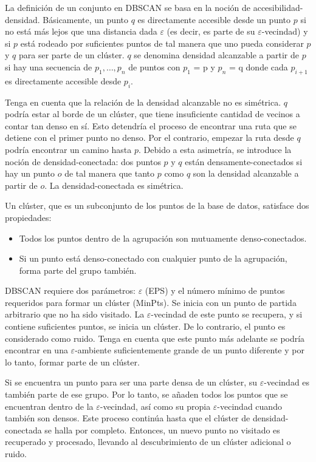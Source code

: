 La definición de un conjunto en DBSCAN se basa en la noción de
accesibilidad-densidad. Básicamente, un punto $q$ es directamente accesible
desde un punto $p$ si no está más lejos que una distancia dada $\varepsilon$ (es 
decir, es parte de su $\varepsilon$-vecindad) y si $p$ está rodeado por
suficientes puntos de tal manera que uno pueda considerar $p$ y $q$ para ser
parte de un clúster. $q$ se denomina densidad alcanzable a partir de $p$ si hay
una secuencia de $p_1,\ldots,p_n$ de puntos con $p_1$ = p y $p_n$ = q donde cada 
$p_{i+1}$ es directamente accesible desde $p_i$.

Tenga en cuenta que la relación de la densidad alcanzable no es simétrica. $q$
podría estar al borde de un clúster, que tiene insuficiente cantidad de vecinos
a contar tan denso en sí. Esto detendría el proceso de encontrar una ruta que se 
detiene con el primer punto no denso. Por el contrario, empezar la ruta desde
$q$ podría encontrar un camino hasta $p$. Debido a esta asimetría, se introduce
la noción de densidad-conectada: dos puntos $p$ y $q$ están
densamente-conectados si hay un punto $o$ de tal manera que tanto $p$ como $q$
son la densidad alcanzable a partir de $o$. La densidad-conectada es simétrica.

Un clúster, que es un subconjunto de los puntos de la base de datos, satisface
dos propiedades:
\begin{itemize}
\item Todos los puntos dentro de la agrupación son mutuamente denso-conectados.
\item Si un punto está denso-conectado con cualquier punto de la agrupación, 
forma parte del grupo también.
\end{itemize}

DBSCAN requiere dos parámetros: $\varepsilon$ (EPS) y el número mínimo de puntos 
requeridos para formar un clúster (MinPts). Se inicia con un punto de partida 
arbitrario que no ha sido visitado. La $\varepsilon$-vecindad de este punto se 
recupera, y si contiene suficientes puntos, se inicia un clúster. De lo
contrario, el punto es considerado como ruido. Tenga en cuenta que este punto más 
adelante se podría encontrar en una $\varepsilon$-ambiente suficientemente
grande de un punto diferente y por lo tanto, formar parte de un clúster.

Si se encuentra un punto para ser una parte densa de un clúster, su 
$\varepsilon$-vecindad es también parte de ese grupo. Por lo tanto, se añaden
todos los puntos que se encuentran dentro de la $\varepsilon$-vecindad, así como
su propia $\varepsilon$-vecindad cuando también son densos. Este proceso
continúa hasta que el clúster  de densidad-conectada se halla por completo.
Entonces, un nuevo punto no visitado es recuperado y procesado, llevando al
descubrimiento de un clúster adicional o ruido.

